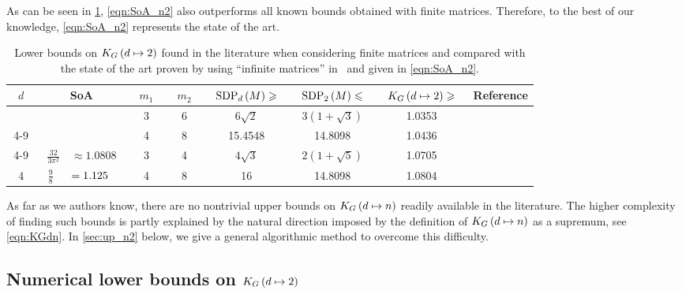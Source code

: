 \documentclass[10pt,aps,notitlepage,onecolumn,pra,superscriptaddress]{revtex4-1}
\renewcommand{\leq}{\leqslant}
\renewcommand{\geq}{\geqslant}
\newcommand\KG[2]{K_G\left({#1}\ifx#2\empty\else\mapsto\fi{#2}\right)}
\newcommand\sdp[2]{\mathrm{SDP}_{#1}\ifx#2\empty\else\left({#2}\right)\fi}
\begin{document}
As can be seen in \cref{tab:literature_n2}, \cref{eqn:SoA_n2} also outperforms all known bounds obtained with finite matrices.
Therefore, to the best of our knowledge, \cref{eqn:SoA_n2} represents the state of the art.

\begin{table}[ht!]
  \centering
  \begin{tabular}{|c|cl|c|c|c|c|c|c|}
    \hline
    ~$d$~                & \multicolumn{2}{c|}{SoA}                                                    & ~$m_1$~ & ~$m_2$~ & ~$\sdp{d}{M}\geq$~ & ~$\sdp{2}{M}\leq$~ & ~$\KG{d}{2}\geq$~ & Reference     \\ \hline
                         &                                        &                                    & 3       & 6       & $6\sqrt2$          & $3(1+\sqrt3)$      & 1.0353            & \cite{BSC+18} \\ \cline{4-9}
                         &                                        &                                    & 4       & 8       & 15.4548            & 14.8098            & 1.0436            & \cite{VP08}   \\ \cline{4-9}
     \multirow{-3}{*}{3} & \multirow{-3}{*}{~$\frac{32}{3\pi^2}$} & \multirow{-3}{*}{$\approx1.0808$~} & 3       & 4       & $4\sqrt3$          & $2(1+\sqrt5)$      & 1.0705            & \cite{Gis09}  \\ \hline
     4                   & $\frac98$                              & $=1.125\hphantom{0}$               & 4       & 8       & 16                 & 14.8098            & 1.0804            & \cite{VP08}   \\ \hline
  \end{tabular}
  \caption{
    Lower bounds on $\KG{d}{2}$ found in the literature when considering finite matrices and compared with the state of the art proven by using ``infinite matrices'' in~\cite{VP09,BBT11} and given in \cref{eqn:SoA_n2}.
  }
  \label{tab:literature_n2}
\end{table}

As far as we authors know, there are no nontrivial upper bounds on $\KG{d}{n}$ readily available in the literature.
The higher complexity of finding such bounds is partly explained by the natural direction imposed by the definition of $\KG{d}{n}$ as a supremum, see \cref{eqn:KGdn}.
In \cref{sec:up_n2} below, we give a general algorithmic method to overcome this difficulty.

\subsection{Numerical lower bounds on \texorpdfstring{$\KG{d}{2}$}{KG(d->2)}}
\label{sec:KGd2_low}
\end{document}
